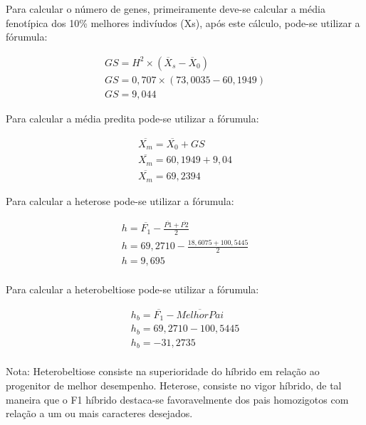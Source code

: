 \begin{solution} 

Para calcular o número de genes, primeiramente deve-se calcular a média fenotípica dos 10\% melhores indivíudos (Xs), após este cálculo, pode-se utilizar a fórumula:

\begin{multline}
 GS = H^2 \times (\overline{X}_s - \overline{X}_0) \\
 GS = 0,707 \times (73,0035 - 60,1949) \\
 GS = 9,044
\end{multline}

\end{solution}


\begin{solution} 

Para calcular a média predita pode-se utilizar a fórumula:

\begin{multline}
 \overline{X_m} = \overline{X_0} + GS \\
 \overline{X_m} = 60,1949 + 9,04 \\
 \overline{X_m} = 69,2394
\end{multline}

\end{solution}


\begin{solution} 

Para calcular a heterose pode-se utilizar a fórumula:

\begin{multline}
 h = \overline{F_1} - \frac{\overline{P1} + \overline{P2}}{2}  \\
 h = 69,2710 - \frac{18,6075+100,5445}{2} \\
 h = 9,695 \\
\end{multline}

Para calcular a heterobeltiose pode-se utilizar a fórumula:

\begin{multline}
 h_b = \overline{F_1} - \overline{Melhor Pai}  \\
 h_b = 69,2710 - 100,5445 \\
 h_b = -31,2735 \\
\end{multline}

Nota: Heterobeltiose consiste na superioridade do híbrido em relação ao progenitor de melhor desempenho. Heterose, consiste no vigor híbrido, de tal maneira que o F1 híbrido destaca-se favoravelmente dos pais homozigotos com relação a um ou mais caracteres desejados.

\end{solution}
